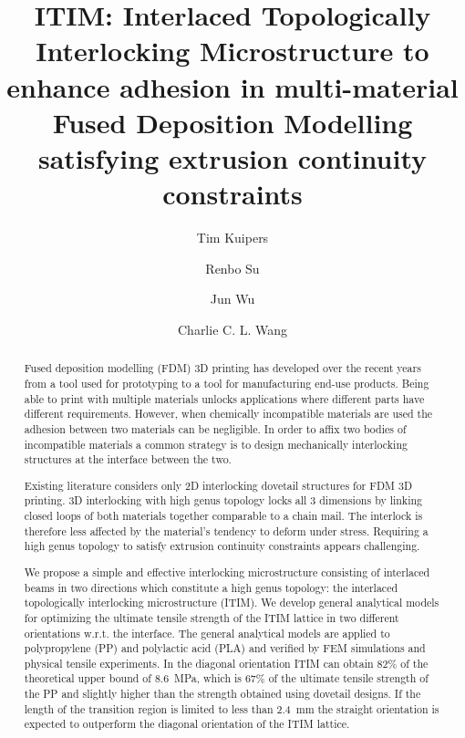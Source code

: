 \documentclass[5p,twocolumn,10pt,times]{elsarticle}
\theoremstyle{definition}
\begin{document}
\baselineskip11pt 

\begin{frontmatter} 

\title{ITIM: Interlaced Topologically Interlocking Microstructure to enhance adhesion in multi-material Fused Deposition Modelling satisfying extrusion continuity constraints}


\author[um,tud]{Tim Kuipers}
\author[man]{Renbo Su}
\author[tud]{Jun Wu}
\author[man]{Charlie C. L. Wang}
\address[um]{Ultimaker, Utrecht, The Netherlands}
\address[tud]{Department of Sustainable Design Engineering, Delft University of Technology, The Netherlands}
\address[man]{Department of Mechanical, Aerospace \& Civil Engineering, The University of Manchester, United Kingdom}


\begin{abstract}
Fused deposition modelling (FDM) 3D printing has developed over the recent years from a tool used for prototyping to a tool for manufacturing end-use products.
Being able to print with multiple materials unlocks applications where different parts have different requirements.
However, when chemically incompatible materials are used the adhesion between two materials can be negligible.
In order to affix two bodies of incompatible materials a common strategy is to design mechanically interlocking structures at the interface between the two.

Existing literature considers only 2D interlocking dovetail structures for FDM 3D printing.
3D interlocking with high genus topology locks all 3 dimensions by linking closed loops of both materials together comparable to a chain mail.
The interlock is therefore less affected by the material's tendency to deform under stress.
Requiring a high genus topology to satisfy extrusion continuity constraints appears challenging.

We propose a simple and effective interlocking microstructure consisting of interlaced beams in two directions which constitute a high genus topology: the interlaced topologically interlocking microstructure (ITIM).
We develop general analytical models for optimizing the ultimate tensile strength of the ITIM lattice in two different orientations w.r.t. the interface.
The general analytical models are applied to polypropylene (PP) and polylactic acid (PLA) and verified by FEM simulations and physical tensile experiments.
In the diagonal orientation ITIM can obtain 82\% of the theoretical upper bound of \SI{8.6}{\mega\pascal}, which is 67\% of the ultimate tensile strength of the PP and slightly higher than the strength obtained using dovetail designs.
If the length of the transition region is limited to less than \SI{2.4}{\milli\meter} the straight orientation is expected to outperform the diagonal orientation of the ITIM lattice.


\end{abstract}
\end{frontmatter}
\end{document}
